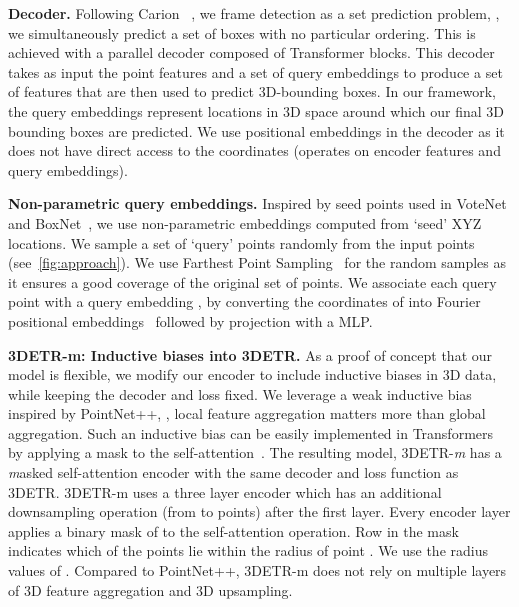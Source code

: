 \documentclass[10pt,twocolumn,letterpaper]{article}
\newcommand{\OURS}{3DETR\xspace}
\newcommand{\OURSm}{3DETR-m\xspace}
\begin{document}
\vspace{0.02in}
\par \noindent \textbf{Decoder.}
Following Carion \etal~\cite{carion2020end}, we frame detection as a set prediction problem, \ie, we simultaneously predict a set of boxes with no particular ordering.
This is achieved with a parallel decoder composed of Transformer blocks.
This decoder takes as input the  point features and a set of  query embeddings  to produce a set of  features that are then used to predict 3D-bounding boxes.
In our framework, the query embeddings  represent locations in 3D space around which our final 3D bounding boxes are predicted.
We use positional embeddings in the decoder as it does not have direct access to the coordinates (operates on encoder features and query embeddings).

\vspace{0.02in}
\par \noindent \textbf{Non-parametric query embeddings.}
Inspired by seed points used in VoteNet and BoxNet~\cite{qi2019votenet}, we use non-parametric embeddings computed from `seed' XYZ locations.
We sample a set of  `query' points  randomly from the  input points (see~\cref{fig:approach}).
We use Farthest Point Sampling~\cite{qi2017pointnet++} for the random samples as it
ensures a good coverage of the original set of points.
We associate each query point  with a query embedding , by converting the coordinates of  into Fourier positional embeddings~\cite{tancik2020fourfeat} followed by projection with a MLP.

\vspace{0.05in}
\par \noindent \textbf{\OURSm: Inductive biases into \OURS.}
As a proof of concept that our model is flexible, we modify our encoder to include inductive biases in 3D data, while keeping the decoder and loss fixed.
We leverage a weak inductive bias inspired by PointNet++,
\ie, local feature aggregation matters more than global aggregation.
Such an inductive bias can be easily implemented in Transformers by applying a mask to the self-attention~\cite{vaswani2017attention}.
The resulting model, \OURS-\emph{m} has a \emph{m}asked self-attention encoder with the same decoder and loss function as \OURS.
\OURSm uses a three layer encoder which has an additional downsampling operation (from  to  points) after the first layer.
Every encoder layer applies a binary mask of  to the self-attention operation.
Row  in the mask indicates which of the  points lie within the  radius of point .
We use the radius values of .
Compared to PointNet++, \OURSm does not rely on multiple layers of 3D feature aggregation and 3D upsampling.
\end{document}
